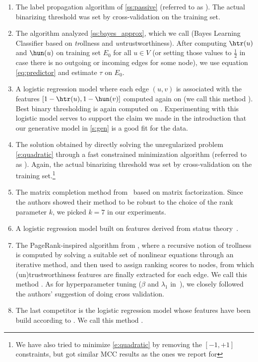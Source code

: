 \begin{enumerate}[label=\textbf{\arabic*.}]
  \item The label propagation algorithm of \autoref{ss:passive} (referred to as \uslpropGsec{}).
    The actual binarizing threshold was set by cross-validation on the training set.

  \item The algorithm analyzed \autoref{ss:bayes_approx}, which we call \usrule{}
    (Bayes Learning Classifier based on \emph{tr}ollness and \emph{un}trustworthiness). After
    computing $\htr(u)$ and $\hun(u)$ on training set $E_0$ for all $u \in V$ (or setting those
    values to $\frac{1}{2}$ in case there is no outgoing or incoming edges for some node), we use
    equation \eqref{eq:predictor} and estimate $\tau$ on $E_0$.

  \item A logistic regression model where each edge $(u,v)$ is associated with the features
    $[1-\htr(u), 1-\hun(v)]$ computed again on \trainset{} (we call this method \uslogregp{}). Best
    binary thresholding is again computed on \trainset{}. Experimenting with this logistic model
    serves to support the claim we made in the introduction that our generative model in
    \autoref{s:gen} is a good fit for the data.

  \item  The solution obtained by directly solving the unregularized problem \eqref{e:quadratic}
    through a fast constrained minimization algorithm (referred to as \qoptim{}). Again, the actual
    binarizing threshold was set by cross-validation on the training set.\footnote{We have also
    tried to minimize \eqref{e:quadratic} by removing the $[-1,+1]$ constraints, but got similar MCC
    results as the ones we report for \qoptim{}}

  \item  The matrix completion method from~\autocite{LowRankCompletion14} based on \complowrank{}
    matrix factorization. Since the authors showed their method to be robust to the choice of the
    rank parameter $k$, we picked $k=7$ in our experiments.

  \item A logistic regression model built on \comptriads{} features derived from status
    theory~\autocite{Leskovec2010}.

  \item The PageRank-inspired algorithm from \autocite{wu2016troll}, where a recursive notion of
    trollness is computed by solving a suitable set of nonlinear equations through an iterative
    method, and then used to assign ranking scores to nodes, from which (un)trustworthiness features
    are finally extracted for each edge. We call this method \compranknodes{}. As for hyperparameter
    tuning ($\beta$ and $\lambda_1$ in~\autocite{wu2016troll}), we closely followed the authors'
    suggestion of doing cross validation.

  \item  The last competitor is the logistic regression model whose features have been build
    according to \autocite{Bayesian15}. We call this method \compbayesian{}.
\end{enumerate}


